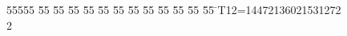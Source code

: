 %
%
\begin{tabbing}
55555 \= 55 \= 55 \= 55 \= 55 \= 55 \= 55 \= 55 \= 55 \= 55 \= 55 \= 55 \= 55 \= \>T12=14472136021531272\\[0pt]
2\>\end{tabbing}
